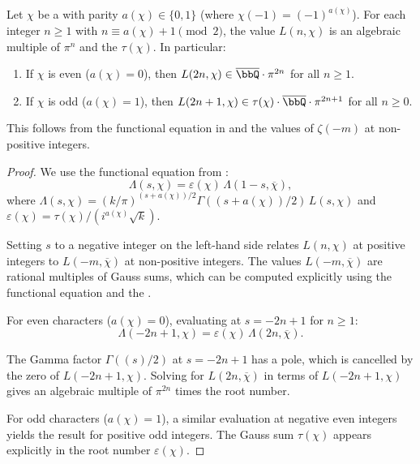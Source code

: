 \begin{corollary} \label{corollary:dirichlet_L_function_at_positive_integers_even_odd_character}
Let $\chi$ be a  with parity $a(\chi) \in \{0,1\}$ (where $\chi(-1) = (-1)^{a(\chi)}$). For each integer $n \geq 1$ with $n \equiv a(\chi) + 1 \pmod{2}$, the value $L(n, \chi)$ is an algebraic multiple of $\pi^n$ and the  $\tau(\chi)$. In particular:
\begin{enumerate}
    \item If $\chi$ is even ($a(\chi) = 0$), then $L(2n, \chi) \in \overline{\bbQ} \cdot \pi^{2n}$ for all $n \geq 1$.
    \item If $\chi$ is odd ($a(\chi) = 1$), then $L(2n+1, \chi) \in \tau(\chi) \cdot \overline{\bbQ} \cdot \pi^{2n+1}$ for all $n \geq 0$.
\end{enumerate}

This follows from the functional equation in  and the values of $\zeta(-m)$ at non-positive integers.
\end{corollary}

\begin{proof}
    We use the functional equation from :
    $$\Lambda(s, \chi) = \varepsilon(\chi)\, \Lambda(1 - s, \overline{\chi}),$$
    where $\Lambda(s,\chi) = (k/\pi)^{(s+a(\chi))/2} \Gamma((s+a(\chi))/2)\, L(s,\chi)$ and $\varepsilon(\chi) = \tau(\chi)/(i^{a(\chi)}\sqrt{k})$.

    Setting $s$ to a negative integer on the left-hand side relates $L(n,\chi)$ at positive integers to $L(-m,\overline{\chi})$ at non-positive integers. The values $L(-m,\overline{\chi})$ are rational multiples of Gauss sums, which can be computed explicitly using the functional equation and the .

    For even characters ($a(\chi) = 0$), evaluating at $s = -2n+1$ for $n \geq 1$:
    $$\Lambda(-2n+1, \chi) = \varepsilon(\chi)\, \Lambda(2n, \overline{\chi}).$$

    The Gamma factor $\Gamma((s)/2)$ at $s = -2n+1$ has a pole, which is cancelled by the zero of $L(-2n+1,\chi)$. Solving for $L(2n,\overline{\chi})$ in terms of $L(-2n+1,\chi)$ gives an algebraic multiple of $\pi^{2n}$ times the root number.

    For odd characters ($a(\chi) = 1$), a similar evaluation at negative even integers yields the result for positive odd integers. The Gauss sum $\tau(\chi)$ appears explicitly in the root number $\varepsilon(\chi)$.
\end{proof}